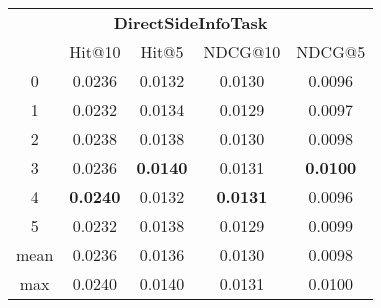 \documentclass{article}
\begin{document}
 

\begin{tabular}{c|cccc}

\multicolumn{5}{c}{\textbf{DirectSideInfoTask}} \\
\noalign{\smallskip}
\noalign{\smallskip}
\toprule
\multicolumn{1}{c}{Template ID} & \multicolumn{1}{|c}{Hit@10} & \multicolumn{1}{c}{Hit@5} & \multicolumn{1}{c}{NDCG@10} & \multicolumn{1}{c}{NDCG@5} \\
\midrule
0 & 0.0236 & 0.0132 & 0.0130 & 0.0096 \\
1 & 0.0232 & 0.0134 & 0.0129 & 0.0097 \\
2 & 0.0238 & 0.0138 & 0.0130 & 0.0098 \\
3 & 0.0236 & \textbf{0.0140} & 0.0131 & \textbf{0.0100} \\
4 & \textbf{0.0240} & 0.0132 & \textbf{0.0131} & 0.0096 \\
5 & 0.0232 & 0.0138 & 0.0129 & 0.0099 \\
\midrule
mean & 0.0236 & 0.0136 & 0.0130 & 0.0098 \\
max & 0.0240 & 0.0140 & 0.0131 & 0.0100 \\
\bottomrule

\end{tabular}
\end{document}
